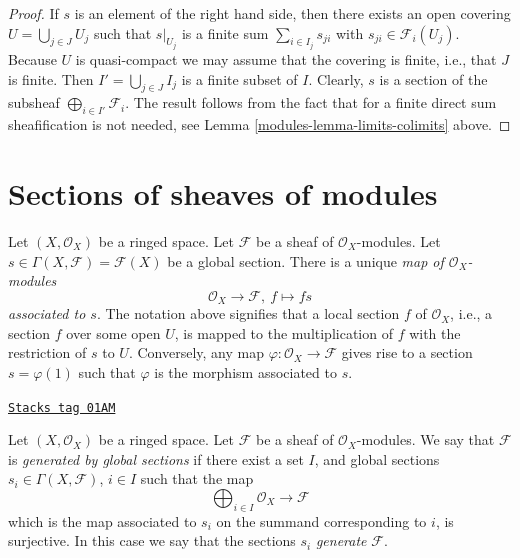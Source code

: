 \begin{proof}

If $s$ is an element of the right hand side, then
there exists an open covering $U = \bigcup_{j \in J} U_j$
such that $s|_{U_j}$ is a finite sum
$\sum_{i \in I_j} s_{ji}$ with $s_{ji} \in \mathcal{F}_i(U_j)$.
Because $U$ is quasi-compact we may assume that the
covering is finite, i.e., that $J$ is finite.
Then $I' = \bigcup_{j \in J} I_j$ is a finite subset of
$I$. Clearly, $s$ is a section of the subsheaf
$\bigoplus_{i \in I'} \mathcal{F}_i$. The result follows
from the fact that for a finite direct sum sheafification
is not needed, see Lemma \ref{modules-lemma-limits-colimits} above.
\end{proof}

\section{Sections of sheaves of modules}
\label{modules-section-sections}
Let $(X, \mathcal{O}_X)$ be a ringed space.
Let $\mathcal{F}$ be a sheaf of $\mathcal{O}_X$-modules.
Let $s \in \Gamma(X, \mathcal{F}) = \mathcal{F}(X)$ be a
global section. There is a unique {\it map of $\mathcal{O}_X$-modules}
$$
\mathcal{O}_X \longrightarrow \mathcal{F}, \ f \longmapsto fs
$$
{\it associated to $s$}. The notation above signifies that a local
section $f$ of $\mathcal{O}_X$, i.e., a section $f$ over some open $U$,
is mapped to the multiplication of $f$ with the restriction of $s$ to
$U$. Conversely, any map $\varphi : \mathcal{O}_X \to \mathcal{F}$
gives rise to a section $s = \varphi(1)$ such that $\varphi$ is
the morphism associated to $s$.

\begin{definition}
\label{modules-definition-globally-generated}
\href{https://stacks.math.columbia.edu/tag/01AM}{\texttt{Stacks tag 01AM}}

Let $(X, \mathcal{O}_X)$ be a ringed space.
Let $\mathcal{F}$ be a sheaf of $\mathcal{O}_X$-modules.
We say that $\mathcal{F}$ is {\it generated by global
sections} if there exist a set $I$, and
global sections $s_i \in \Gamma(X, \mathcal{F})$, $i \in I$
such that the map
$$
\bigoplus\nolimits_{i \in I}
\mathcal{O}_X \longrightarrow \mathcal{F}
$$
which is the map associated to $s_i$ on the summand corresponding to $i$,
is surjective. In this case we say that the sections $s_i$
{\it generate} $\mathcal{F}$.
\end{definition}

